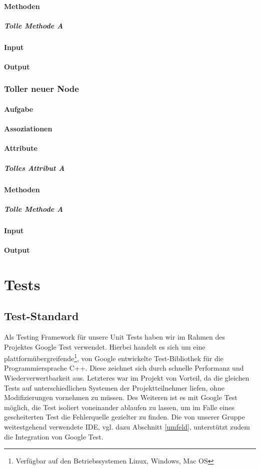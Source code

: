 \documentclass[a4paper, 12pt, titlepage]{scrartcl}
\begin{document}
				\paragraph{Methoden}
					\subparagraph{Tolle Methode A}
				\paragraph{Input}
				\paragraph{Output}
				
			\subsubsection{Toller neuer Node}
			\label{controller_ui}
				\paragraph{Aufgabe}
				\paragraph{Assoziationen}
				\paragraph{Attribute}
					\subparagraph{Tolles Attribut A}
				\paragraph{Methoden}
					\subparagraph{Tolle Methode A}
				\paragraph{Input}
				\paragraph{Output}			
				
	\section{Tests}
	\label{tests}
		\subsection{Test-Standard}
		\label{test_standard}
		Als Testing Framework für unsere Unit Tests haben wir im Rahmen des Projektes Google Test verwendet.
		Hierbei handelt es sich um eine plattformübergreifende\footnote{Verfügbar auf den Betriebssystemen Linux, Windows, Mac OS},
		von Google entwickelte Test-Bibliothek für die Programmiersprache C++. Diese zeichnet sich durch schnelle Performanz und 
		Wiederverwertbarkeit aus. Letzteres war im Projekt von Vorteil, da die gleichen Tests auf unterschiedlichen Systemen der 
		Projektteilnehmer liefen, ohne Modifizierungen vornehmen zu müssen. Des Weiteren ist es mit Google Test möglich, die Test 
		isoliert voneinander ablaufen zu lassen, um im Falle eines gescheiterten Test die Fehlerquelle gezielter zu finden. Die von unserer Gruppe weitestgehend verwendete IDE, vgl. dazu Abschnitt \ref{umfeld}, unterstützt zudem die Integration von Google Test. 
		
\end{document}
